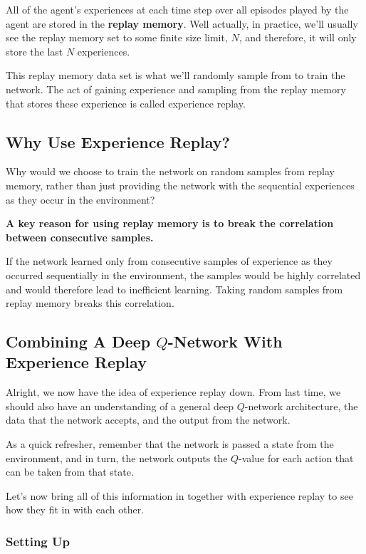 All of the agent's experiences at each time step over all episodes played by the agent 
are stored in the {\bf replay memory}. Well actually, in practice, we'll usually see the 
replay memory set to some finite size limit, $N$, and therefore, it will only store the 
last $N$ experiences.

This replay memory data set is what we'll randomly sample from to train the network. The 
act of gaining experience and sampling from the replay memory that stores these experience 
is called experience replay.

\subsection{Why Use Experience Replay?}

Why would we choose to train the network on random samples from replay memory, rather 
than just providing the network with the sequential experiences as they occur in the 
environment?

\begin{emp_box}
{\bf A key reason for using replay memory is to break the correlation between consecutive 
samples.}
\end{emp_box}

If the network learned only from consecutive samples of experience as they occurred 
sequentially in the environment, the samples would be highly correlated and would 
therefore lead to inefficient learning. Taking random samples from replay memory breaks 
this correlation.


\subsection{Combining A Deep $Q$-Network With Experience Replay}

Alright, we now have the idea of experience replay down. From last time, we should also 
have an understanding of a general deep $Q$-network architecture, the data that the network 
accepts, and the output from the network.

As a quick refresher, remember that the network is passed a state from the environment, 
and in turn, the network outputs the $Q$-value for each action that can be taken from 
that state.

Let's now bring all of this information in together with experience replay to see how 
they fit in with each other.


\subsubsection{Setting Up}


